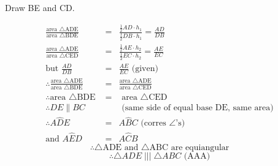 \begin{schooltheorem}
{\begin{tabbing}
\>Draw BE and CD. \end{tabbing}
\begin{eqnarray*}
\frac{\text{area $\triangle$ADE}}{\text{area $\triangle$BDE}} &=& \frac{\frac{1}{2}AD\cdot h_1}{\frac{1}{2}DB\cdot h_1} = \frac{AD}{DB}\\
\frac{\text{area $\triangle$ADE}}{\text{area $\triangle$CED}} &=& \frac{\frac{1}{2}AE\cdot h_2}{\frac{1}{2}EC\cdot h_2} = \frac{AE}{EC}\\
\text{but } \frac{AD}{DB} &=& \frac{AE}{EC} \text{    (given)}\\
\therefore \frac{\text{area $\triangle$ADE}}{\text{area $\triangle$BDE}} &=& \frac{\text{area $\triangle$ADE}}{\text{area $\triangle$CED}}\\
\therefore \text{area $\triangle$BDE } &=& \text{ area $\triangle$CED}\\
\therefore DE \parallel BC & &\text{   (same side of equal base DE, same area)}\\
\therefore A\hat{D}E &=& A\hat{B}C  \text{   (corres $\angle$'s)}\\
\text{and } A\hat{E}D &=& A\hat{C}{B}
\end{eqnarray*}
$$\therefore \text{$\triangle$ADE and $\triangle$ABC are equiangular}$$
$$\therefore \triangle ADE \; ||| \; \triangle ABC \text{   (AAA)}$$

}
\end{schooltheorem}

